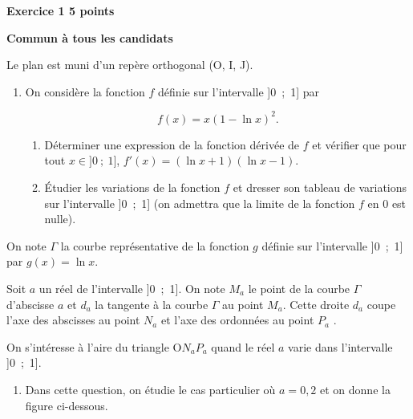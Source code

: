 \documentclass{cornouaille}
\begin{document}
\begin{exercice}[Liban 2019]
\textbf{Exercice 1 \hfill 5 points} 

\textbf{Commun à tous les candidats} 

\medskip

Le plan est muni d'un repère orthogonal (O, I, J).

\medskip 

\begin{enumerate}
\item On considère la fonction $f$ définie sur l'intervalle ]0~;~1] par 

\[f(x) = x(1 - \ln x)^2.\]

	\begin{enumerate}
		\item Déterminer une expression de la fonction dérivée de $f$ et vérifier que pour tout $x \in ]0~;~1]$, $f'(x) = (\ln x + 1)(\ln x - 1)$. 
		\item Étudier les variations de la fonction $f$ et dresser son tableau de variations sur l'intervalle ]0~;~1] (on admettra que la limite de la fonction $f$ en 0 est nulle). 
\end{enumerate}
	\end{enumerate}

On note $\Gamma$ la courbe représentative de la fonction $g$ définie sur l'intervalle ]0~;~1]  par $g(x) = \ln x$. 

Soit $a$ un réel de l'intervalle ]0~;~1]. On note $M_a$ le point de la courbe $\Gamma$ d'abscisse $a$ et $d_a$ la tangente à la courbe $\Gamma$ au point $M_a$. Cette droite $d_a$ coupe l'axe des abscisses au point $N_a$ et l'axe des ordonnées au point $P_a$ . 

On s'intéresse à l'aire du triangle O$N_aP_a$ quand le réel $a$ varie dans l'intervalle ]0~;~1]. 

\begin{enumerate}[resume]
\item Dans cette question, on étudie le cas particulier où $a = 0,2$ et on donne la figure ci-dessous. 

\begin{center}
\end{center}    


\end{enumerate}
\end{exercice}
\end{document}
